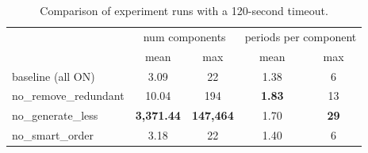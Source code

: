 	
\begin{table}[H]
	\centering
	\begin{tabular}{l c c c c}
		\toprule
	& \multicolumn{2}{c}{num components} & \multicolumn{2}{c}{periods per component} \\
	\cmidrule(lr){2-3} \cmidrule(lr){4-5}
	& mean & max & mean & max \\
	\midrule
	baseline (all ON)         &   3.09    &   22    &   1.38   &    6   \\
	no\_remove\_redundant     &  10.04    &  194    &   \textbf{1.83}   &   13   \\
	no\_generate\_less        &\textbf{3{,}371.44}    &\textbf{147{,}464}   &   1.70   &   \textbf{29}   \\
	no\_smart\_order          &   3.18    &   22    &   1.40   &    6   \\
  \bottomrule
  \end{tabular}
  \caption{Comparison of experiment runs with a 120-second timeout.}
\end{table}



\newpage